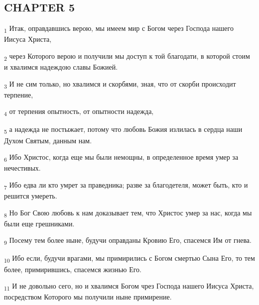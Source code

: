 \subsection{CHAPTER 5}
\begin{tcolorbox}
\textsubscript{1} Итак, оправдавшись верою, мы имеем мир с Богом через Господа нашего Иисуса Христа,
\end{tcolorbox}
\begin{tcolorbox}
\textsubscript{2} через Которого верою и получили мы доступ к той благодати, в которой стоим и хвалимся надеждою славы Божией.
\end{tcolorbox}
\begin{tcolorbox}
\textsubscript{3} И не сим только, но хвалимся и скорбями, зная, что от скорби происходит терпение,
\end{tcolorbox}
\begin{tcolorbox}
\textsubscript{4} от терпения опытность, от опытности надежда,
\end{tcolorbox}
\begin{tcolorbox}
\textsubscript{5} а надежда не постыжает, потому что любовь Божия излилась в сердца наши Духом Святым, данным нам.
\end{tcolorbox}
\begin{tcolorbox}
\textsubscript{6} Ибо Христос, когда еще мы были немощны, в определенное время умер за нечестивых.
\end{tcolorbox}
\begin{tcolorbox}
\textsubscript{7} Ибо едва ли кто умрет за праведника; разве за благодетеля, может быть, кто и решится умереть.
\end{tcolorbox}
\begin{tcolorbox}
\textsubscript{8} Но Бог Свою любовь к нам доказывает тем, что Христос умер за нас, когда мы были еще грешниками.
\end{tcolorbox}
\begin{tcolorbox}
\textsubscript{9} Посему тем более ныне, будучи оправданы Кровию Его, спасемся Им от гнева.
\end{tcolorbox}
\begin{tcolorbox}
\textsubscript{10} Ибо если, будучи врагами, мы примирились с Богом смертью Сына Его, то тем более, примирившись, спасемся жизнью Его.
\end{tcolorbox}
\begin{tcolorbox}
\textsubscript{11} И не довольно сего, но и хвалимся Богом чрез Господа нашего Иисуса Христа, посредством Которого мы получили ныне примирение.
\end{tcolorbox}
